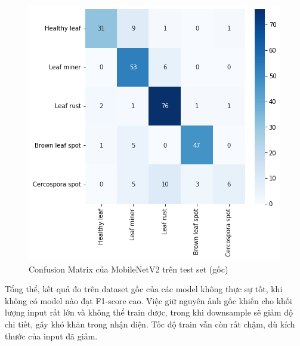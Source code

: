 \documentclass[a4paper,14pt]{extarticle}
\begin{document}
		\begin{figure}[H]
			\centering
			\includegraphics[scale=0.8]{images/mobilenetv2_matrix.png}
			\caption{Confusion Matrix của MobileNetV2 trên test set (gốc)}
		\end{figure}

		Tổng thể, kết quả đo trên dataset gốc của các model không thực sự tốt, khi không có model nào đạt F1-score cao. Việc giữ nguyên ảnh gốc khiến cho khối lượng input rất lớn và không thể train được, trong khi downsample sẽ giảm độ chi tiết, gây khó khăn trong nhận diện. Tốc độ train vẫn còn rất chậm, dù kích thước của input đã giảm.
\end{document}
